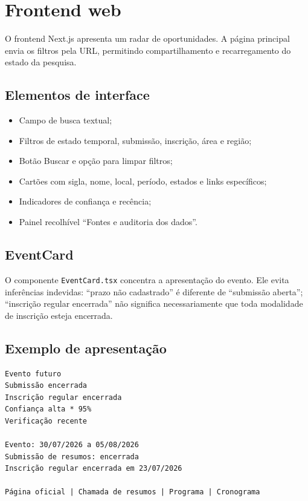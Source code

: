 \chapter{Frontend web}

O frontend Next.js apresenta um radar de oportunidades. A página principal envia os filtros pela URL, permitindo compartilhamento e recarregamento do estado da pesquisa.

\section{Elementos de interface}

\begin{itemize}[leftmargin=*,itemsep=0.25em]
\item Campo de busca textual;
\item Filtros de estado temporal, submissão, inscrição, área e região;
\item Botão Buscar e opção para limpar filtros;
\item Cartões com sigla, nome, local, período, estados e links específicos;
\item Indicadores de confiança e recência;
\item Painel recolhível “Fontes e auditoria dos dados”.
\end{itemize}

\section{EventCard}

O componente \texttt{EventCard.tsx} concentra a apresentação do evento. Ele evita inferências indevidas: “prazo não cadastrado” é diferente de “submissão aberta”; “inscrição regular encerrada” não significa necessariamente que toda modalidade de inscrição esteja encerrada.

\section{Exemplo de apresentação}

\begin{lstlisting}
Evento futuro
Submissão encerrada
Inscrição regular encerrada
Confiança alta * 95%
Verificação recente

Evento: 30/07/2026 a 05/08/2026
Submissão de resumos: encerrada
Inscrição regular encerrada em 23/07/2026

Página oficial | Chamada de resumos | Programa | Cronograma
\end{lstlisting}
